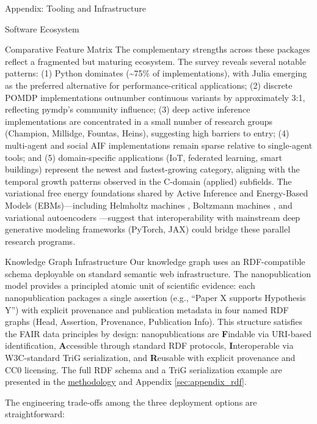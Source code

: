 \documentclass[
  ignorenonframetext,
]{beamer}
\begin{document}
\begin{frame}[fragile]{Appendix: Tooling and Infrastructure
\label{sec:tooling}}
\begin{block}{Software Ecosystem}
\begin{block}{Comparative Feature Matrix}
The complementary strengths across these packages reflect a fragmented
but maturing ecosystem. The survey reveals several notable patterns: (1)
Python dominates (\textasciitilde75\% of implementations), with Julia
emerging as the preferred alternative for performance-critical
applications; (2) discrete POMDP implementations outnumber continuous
variants by approximately 3:1, reflecting pymdp's community influence;
(3) deep active inference implementations are concentrated in a small
number of research groups (Champion, Millidge, Fountas, Heins),
suggesting high barriers to entry; (4) multi-agent and social AIF
implementations remain sparse relative to single-agent tools; and (5)
domain-specific applications (IoT, federated learning, smart buildings)
represent the newest and fastest-growing category, aligning with the
temporal growth patterns observed in the C-domain (applied) subfields.
The variational free energy foundations shared by Active Inference and
Energy-Based Models (EBMs)---including Helmholtz machines
\citep{dayan1995helmholtz}, Boltzmann machines
\citep{hinton2002training}, and variational autoencoders
\citep{kingma2014auto}---suggest that interoperability with mainstream
deep generative modeling frameworks (PyTorch, JAX) could bridge these
parallel research programs.
\end{block}
\end{block}

\begin{block}{Knowledge Graph Infrastructure}
\protect{}\label{knowledge-graph-infrastructure}
Our knowledge graph uses an RDF-compatible schema deployable on standard
semantic web infrastructure. The nanopublication model
\citep{groth2010anatomy, kuhn2016decentralized} provides a principled
atomic unit of scientific evidence: each nanopublication packages a
single assertion (e.g., ``Paper X supports Hypothesis Y'') with explicit
provenance and publication metadata in four named RDF graphs (Head,
Assertion, Provenance, Publication Info). This structure satisfies the
FAIR data principles by design: nanopublications are \textbf{F}indable
via URI-based identification, \textbf{A}ccessible through standard RDF
protocols, \textbf{I}nteroperable via W3C-standard TriG serialization,
and \textbf{R}eusable with explicit provenance and CC0 licensing. The
full RDF schema and a TriG serialization example are presented in the
\hyperref[sec:methods_kg]{methodology} and Appendix
\ref{sec:appendix_rdf}.

The engineering trade-offs among the three deployment options are
straightforward:


\end{block}
\end{frame}
\end{document}
